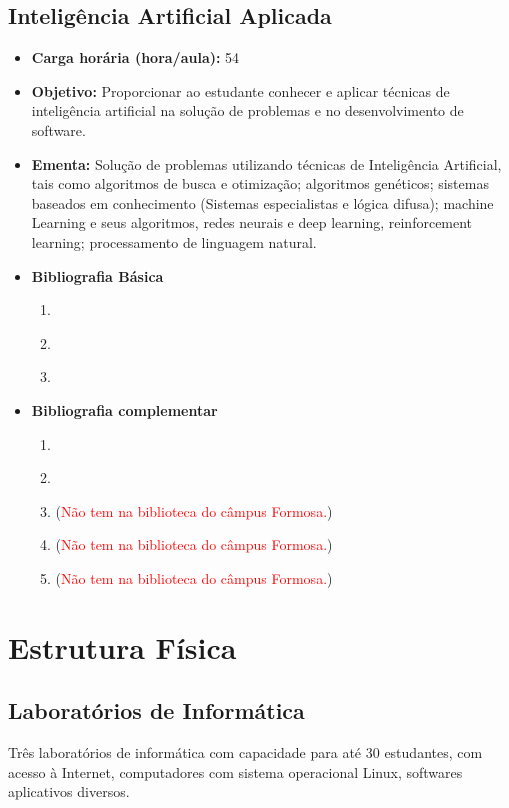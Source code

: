 \documentclass[
	10pt,				%
	openright,			%
	twoside,			%
	a4paper,			%
	english,			%
	french,				%
	brazil,				%
	sumario=tradicional
]{abntex2}
\begin{document}
\section*{Inteligência Artificial Aplicada}\label{6_opt04}
\begin{itemize}
	\item \textbf{Carga horária (hora/aula):} 54
	\item \textbf{Objetivo:} Proporcionar ao estudante conhecer e aplicar técnicas de inteligência artificial na solução de problemas e no desenvolvimento de software.
	\item \textbf{Ementa:} 
	Solução de problemas utilizando técnicas de Inteligência Artificial, tais como algoritmos de busca e otimização; algoritmos genéticos; sistemas baseados em conhecimento (Sistemas especialistas e lógica difusa); machine Learning e seus algoritmos, redes neurais e deep learning, reinforcement learning; processamento de linguagem natural.
	\item \textbf{Bibliografia Básica}
	\begin{enumerate}
		\item \cite{russellnorvig2013ia}
		\item \cite{barbetta2004estatistica}
		\item 
	\end{enumerate}
	\item \textbf{Bibliografia complementar}
	\begin{enumerate}
		\item \cite{farberestatistica}
		\item \cite{	almir2009ia}
		\item \cite{haykin2001ia} (\textcolor{red}{Não tem na biblioteca do câmpus Formosa.})
		\item \cite{carvalho2011ia} (\textcolor{red}{Não tem na biblioteca do câmpus Formosa.})
		\item \cite{	luger2013ia} (\textcolor{red}{Não tem na biblioteca do câmpus Formosa.})
	\end{enumerate} 	
\end{itemize}



\chapter{Estrutura Física}\label{estrutura}

\section*{Laboratórios de Informática}
Três laboratórios de informática com capacidade para até 30 estudantes, com acesso à Internet, computadores com sistema operacional Linux, softwares aplicativos diversos.
\end{document}
